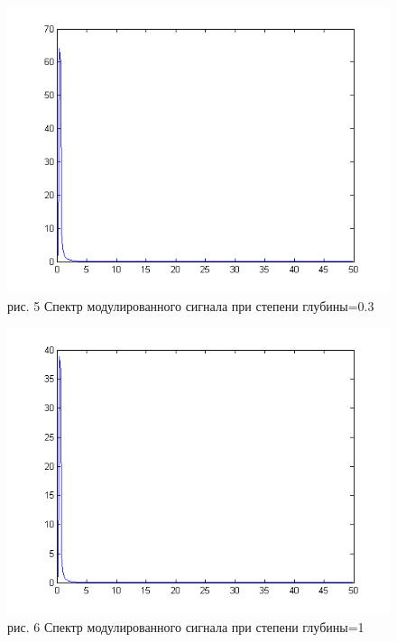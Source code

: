 \documentclass[10pt,a4paper]{report}
\begin{document}
\begin{figure}
\begin{center}
\includegraphics[angle=0, scale = 0.8]{1_3.png}\newline
рис. 5  Спектр модулированного сигнала при степени глубины=0.3\newline
\end{center}
\end{figure}
\begin{figure}
\begin{center}
\includegraphics[angle=0, scale = 0.8]{1_5.png}\newline
рис. 6  Спектр модулированного сигнала при степени глубины=1\newline
\end{center}
\end{figure}
\end{document}

